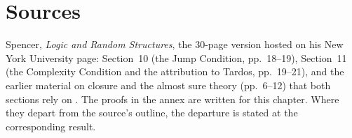 \section{Sources}
\label{sec:p03-w03-p03-070-sources}

Spencer, \emph{Logic and Random Structures}, the 30-page version hosted on his
New York University page: Section~10 (the Jump Condition, pp.~18--19), Section~11
(the Complexity Condition and the attribution to Tardos, pp.~19--21), and the
earlier material on closure and the almost sure theory (pp.~6--12) that both
sections rely on \cite{Spencer2007LogicRandomStructuresAuthor}.  The proofs in
the annex are written for this chapter.  Where they depart from the source's
outline, the departure is stated at the corresponding result.
